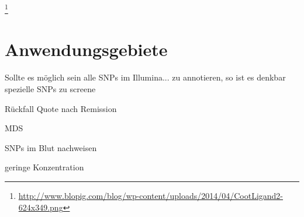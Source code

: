 \footnote{\url{http://www.blopig.com/blog/wp-content/uploads/2014/04/CootLigand2-624x349.png}}




\chapter{Anwendungsgebiete}

Sollte es möglich sein alle \ac{SNPs} im Illumina... zu annotieren, so ist es denkbar spezielle SNPs zu screene


Rückfall Quote nach Remission

MDS

SNPs im Blut nachweisen

geringe Konzentration



